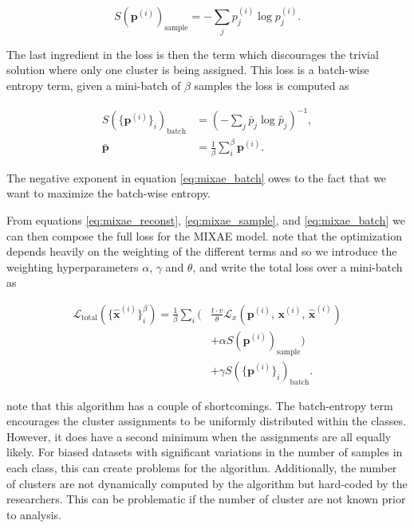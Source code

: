 \begin{equation}\label{eq:mixae_sample}
S(\boldsymbol{p}^{(i)})_{\text{sample}} = -\sum_j p_j^{(i)} \log p_j^{(i)}. 
\end{equation}

\noindent The last ingredient in the loss is then the term which discourages the trivial solution where only one cluster is being assigned. This loss is a batch-wise entropy term, given a mini-batch of $\beta$ samples the loss is computed as 

\begin{equation}\label{eq:mixae_batch}
\begin{split}
S(\{\boldsymbol{p}^{(i)}\}_i)_{\text{batch}}&= \left(-\sum_j \bar{p}_j \log \bar{p}_j \right)^{-1},\\
\bar{\boldsymbol{p}} &= \frac{1}{\beta} \sum_i ^\beta \boldsymbol{p}^{(i)} .
\end{split}
\end{equation}

\noindent The negative exponent in equation \ref{eq:mixae_batch} owes to the fact that we want to maximize the batch-wise entropy.

From equations \ref{eq:mixae_reconst}, \ref{eq:mixae_sample}, and \ref{eq:mixae_batch} we can then compose the full loss for the MIXAE model. \cite{Zhang} note that the optimization depends heavily on the weighting of the different terms and so we introduce the weighting hyperparameters $\alpha$, $\gamma$ and $\theta$, and write the total loss over a mini-batch as 

\begin{equation}\label{eq:mixae_loss}
\begin{split}
\mathcal{L}_{\text{total}}(\{\hat{\boldsymbol{x}}^{(i)}\}^\beta_i) = \frac{1}{\beta}\sum_i \Big( &\frac{t\cdot v}{\theta} \mathcal{L}_x(\boldsymbol{p}^{(i)},\,\boldsymbol{x}^{(i)},\, \hat{\boldsymbol{x}}^{(i)} ) \\
&+ \alpha S(\boldsymbol{p}^{(i)})_{\text{sample}} \Big) \\
&+\gamma S(\{\boldsymbol{p}^{(i)}\}_i)_{\text{batch}}.
\end{split}
\end{equation}

\noindent \citet{Zhang} note that this algorithm has a couple of shortcomings. The batch-entropy term encourages the cluster assignments to be uniformly distributed within the classes. However, it does have a second minimum when the assignments are all equally likely. For biased datasets with significant variations in the number of samples in each class, this can create problems for the algorithm. Additionally, the number of clusters are not dynamically computed by the algorithm but hard-coded by the researchers. This can be problematic if the number of cluster are not known prior to analysis.

